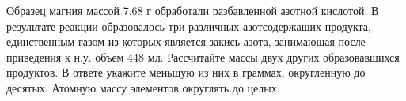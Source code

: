 
Образец магния массой 7.68 г обработали разбавленной азотной кислотой. В результате реакции образовалось три различных азотсодержащих продукта, единственным газом из которых  является закись азота, занимающая после приведения к н.у. объем 448 мл. Рассчитайте массы двух других образовавшихся продуктов. В ответе укажите меньшую из них в граммах, округленную до десятых. Атомную массу элементов округлять до целых.



